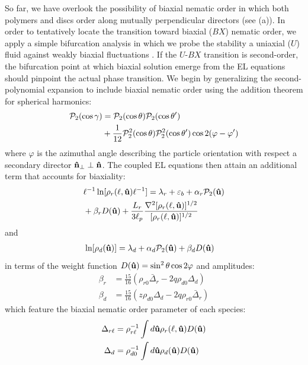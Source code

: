 So far, we have overlook the possibility of biaxial nematic order in which both polymers and discs order along mutually perpendicular directors (see (a)).
In order to tentatively locate the transition toward biaxial ($BX$) nematic order, we  apply a simple bifurcation analysis in which we probe the stability a uniaxial ($U$) fluid against weakly biaxial fluctuations \cite{kayser,stroobants1984}. If the $U$-$BX$ transition is second-order, the bifurcation point at which biaxial solution emerge from the EL equations should pinpoint the actual phase transition.  We begin by generalizing the second-polynomial expansion  to include biaxial nematic order using the addition theorem for spherical harmonics:
\begin{align}
{\mathcal P}_{2}( \cos \gamma ) &= {\mathcal P}_{2}(\cos \theta) {\mathcal P}_{2}(\cos \theta^{\prime})  \nonumber \\ 
& + \frac{1}{12} {\mathcal P}_{2}^{2}(\cos \theta) {\mathcal P}_{2}^{2}(\cos \theta^{\prime}) \cos 2 (\varphi - \varphi^{\prime})
\end{align}
where $\varphi$ is the azimuthal angle describing the particle orientation  with respect a secondary director ${\bf \hat{n}}_{\perp} \perp {\bf \hat{n}}$. The coupled EL equations then attain an additional term that accounts for biaxiality: 
\begin{align}
&  \ell^{-1} \ln [  \rho_{r} (\ell, {\bf \hat{u}} ) \ell^{-1} ]   = \lambda_{r}    + \varepsilon_{b}  +  \alpha_{r}  {\mathcal P}_{2}({\bf \hat{u}} ) \nonumber \\ 
& +  \beta_{r } D({\bf \hat{u}})   +  \frac{L_{r}}{3\ell_{p}} \frac{\nabla^{2} [ \rho_{r} (\ell , {\bf \hat{u}})]^{1/2}}{ [ \rho_{r} (\ell , {\bf \hat{u}})]^{1/2} }
\label{lnrhorbiax}
\end{align}
and
\begin{align}
\ln [  \rho_{d} ({\bf \hat{u}} )] & = \lambda_{d}  + \alpha_{d} {\mathcal P}_{2}({\bf \hat{u}})  + \beta_{d} D({\bf \hat{u}} )  
\label{lndbiax}
\end{align}
in terms of the  weight function $D({\bf \hat{u}}) = \sin^{2} \theta  \cos 2 \varphi $ and amplitudes: 
\begin{align}
\beta_{r} &=  \frac{15 }{16}  ( \rho_{r0} \bar{\Delta}_{r}  - 2q  \rho_{d0}  \Delta_{d} )  \nonumber \\
\beta_{d} &=   \frac{15 }{16}  (z \rho_{d0}  \Delta_{d}  - 2 q \rho_{r0}  \bar{\Delta}_{r} )
\label{alphabetabiax}
\end{align}
which feature the biaxial nematic order parameter of each species:
\begin{align}
\Delta_{r \ell} &= \rho_{r \ell}^{-1} \int d {\bf \hat{u}} \rho_{r}(\ell, {\bf \hat{u}}) D ({\bf \hat{u}}) \nonumber \\
\Delta_{d} &= \rho_{d0}^{-1} \int d {\bf \hat{u}} \rho_{d}( {\bf \hat{u}}) D ({\bf \hat{u}} ) 
\label{dr}
\end{align}
